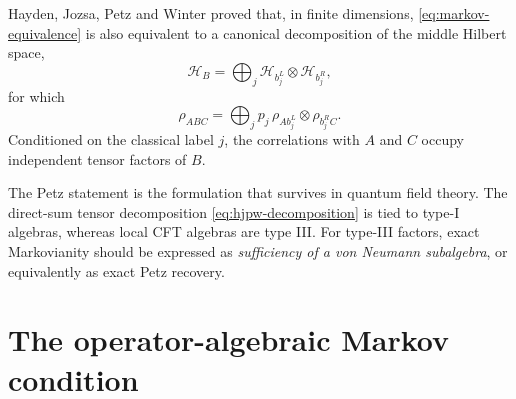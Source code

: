 \documentclass[11pt]{article}
\theoremstyle{accenttheorem}
\theoremstyle{definition}
\newcommand{\1}{\mathbf{1}}
\begin{document}
Hayden, Jozsa, Petz and Winter proved that, in finite dimensions, \eqref{eq:markov-equivalence} is also equivalent to a canonical decomposition of the middle Hilbert space,
\begin{equation}\label{eq:hjpw-decomposition}
 \mathcal H_B
 =\bigoplus_j \mathcal H_{b_j^L}\otimes\mathcal H_{b_j^R},
\end{equation}
for which
\begin{equation}\label{eq:hjpw-state}
 \rho_{ABC}
 =\bigoplus_j p_j\,
   \rho_{A b_j^L}\otimes\rho_{b_j^R C}.
\end{equation}
Conditioned on the classical label \(j\), the correlations with \(A\) and \(C\) occupy independent tensor factors of \(B\).

\begin{interpretationbox}
The Petz statement is the formulation that survives in quantum field theory.  The direct-sum tensor decomposition \eqref{eq:hjpw-decomposition} is tied to type-I algebras, whereas local CFT algebras are type III.  For type-III factors, exact Markovianity should be expressed as \emph{sufficiency of a von Neumann subalgebra}, or equivalently as exact Petz recovery.
\end{interpretationbox}

\section{The operator-algebraic Markov condition}
\end{document}
